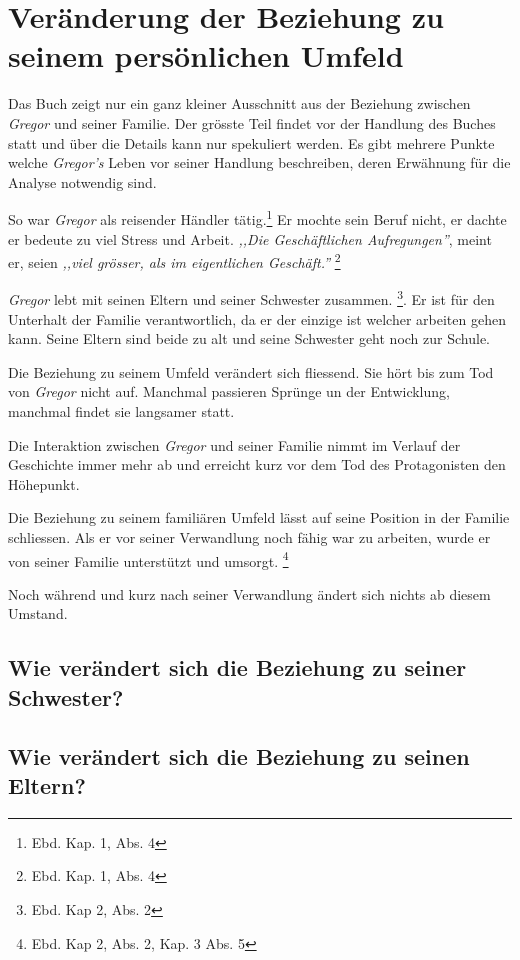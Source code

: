 \documentclass[12pt,a4paper,twoside,titlepage]{article}
\begin{document}
	
	
	\section{Veränderung der Beziehung zu seinem persönlichen Umfeld}
	Das Buch zeigt nur ein ganz kleiner Ausschnitt aus der Beziehung zwischen \textit{Gregor} und seiner Familie. Der grösste Teil findet vor der Handlung des Buches statt und über die Details kann nur spekuliert werden. Es gibt mehrere Punkte welche \textit{Gregor's} Leben vor seiner Handlung beschreiben, deren Erwähnung für die Analyse notwendig sind.
	
	So war \textit{Gregor} als reisender Händler tätig.\footnote{Ebd. Kap. 1, Abs. 4} Er mochte sein Beruf nicht, er dachte er bedeute zu viel Stress und Arbeit. \textit{,,Die Geschäftlichen Aufregungen''}, meint er, seien \textit{,,viel grösser, als im eigentlichen Geschäft.''} \footnote{Ebd. Kap. 1, Abs. 4}
	
	\textit{Gregor} lebt mit seinen Eltern und seiner Schwester zusammen. \footnote{Ebd. Kap 2, Abs. 2}. Er ist für den Unterhalt der Familie verantwortlich, da er der einzige ist welcher arbeiten gehen kann. Seine Eltern sind beide zu alt und seine Schwester geht noch zur Schule.
	
	Die Beziehung zu seinem Umfeld verändert sich fliessend. Sie hört bis zum Tod von \textit{Gregor} nicht auf. Manchmal passieren Sprünge un der Entwicklung, manchmal findet sie langsamer statt. 
	
	
	Die Interaktion zwischen \textit{Gregor} und seiner Familie nimmt im Verlauf der Geschichte immer mehr ab und erreicht kurz vor dem Tod des Protagonisten den Höhepunkt.

	Die Beziehung zu seinem familiären Umfeld lässt auf seine Position in der Familie schliessen. Als er vor seiner Verwandlung noch fähig war zu arbeiten, wurde er von seiner Familie unterstützt und umsorgt. \footnote{Ebd. Kap 2, Abs. 2, Kap. 3 Abs. 5}

	Noch während und kurz nach seiner Verwandlung ändert sich nichts ab diesem Umstand.
	
	\subsection{Wie verändert sich die Beziehung zu seiner Schwester?}
	
	\subsection{Wie verändert sich die Beziehung zu seinen Eltern?}
\end{document}

